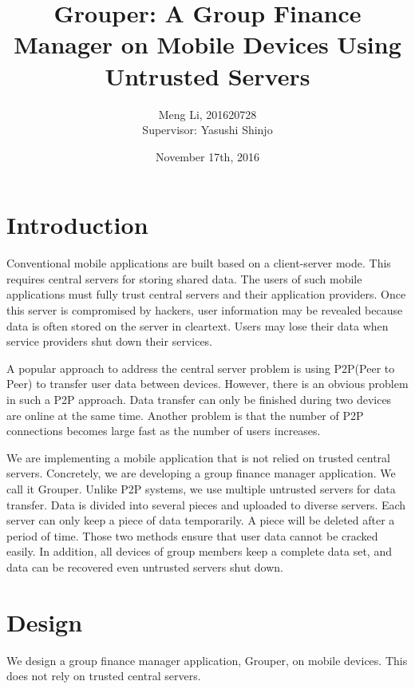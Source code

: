 \documentclass[twocolumn,10pt]{article}
\begin{document}
\date{November 17th, 2016}

\title{\bf Grouper: A Group Finance Manager on Mobile Devices Using Untrusted Servers}

\author{
	Meng Li, 201620728  
	\\ Supervisor: Yasushi Shinjo
}

\maketitle

\section{Introduction}
Conventional mobile applications are built based on a client-server mode. This requires central servers for storing shared data. The users of such mobile applications must fully trust central servers and their application providers. Once this server is compromised by hackers, user information may be revealed because data is often stored on the server in cleartext. Users may lose their data when service providers shut down their services. 

A popular approach to address the central server problem is using P2P(Peer to Peer) to transfer user data between devices. However, there is an obvious problem in such a P2P approach. Data transfer can only be finished during two devices are online at the same time. Another problem is that the number of P2P connections becomes large  fast as the number of users increases. 

We are implementing a mobile application that is not relied on trusted central servers. Concretely, we are developing a group finance manager application. We call it Grouper. Unlike P2P systems, we use multiple untrusted servers for data transfer. Data is divided into several pieces and uploaded to diverse servers. Each server can only keep a piece of data temporarily. A piece will be deleted after a period of time. Those two methods ensure that user data cannot be cracked easily. In addition, all devices of group members keep a complete data set, and data can be recovered even untrusted servers shut down.

\section{Design}

We design a group finance manager application, Grouper, on mobile devices. This does not rely on trusted central servers. 
\end{document}
